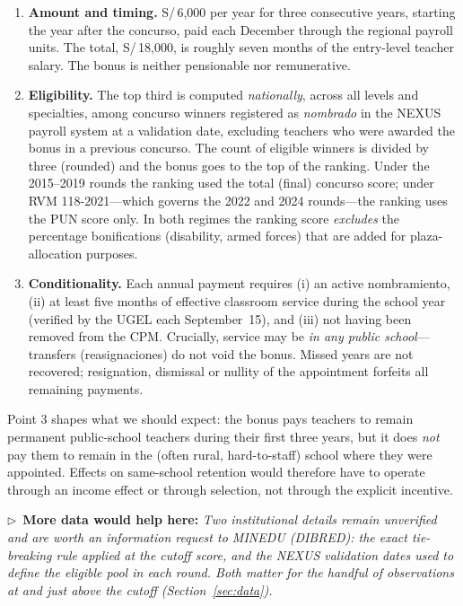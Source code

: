 \documentclass[11pt]{article}
\newcommand{\dataneed}[1]{\par\medskip\noindent\begin{small}\noindent
$\triangleright$~\textbf{More data would help here:} \emph{#1}\end{small}\par\medskip}
\begin{document}
\begin{enumerate}
\item \textbf{Amount and timing.} S/\,6,000 per year for three consecutive
years, starting the year after the concurso, paid each December through the
regional payroll units. The total, S/\,18,000, is roughly seven months of the
entry-level teacher salary. The bonus is neither pensionable nor
remunerative.
\item \textbf{Eligibility.} The top third is computed \emph{nationally},
across all levels and specialties, among concurso winners registered as
\emph{nombrado} in the NEXUS payroll system at a validation date, excluding
teachers who were awarded the bonus in a previous concurso. The count of
eligible winners is divided by three (rounded) and the bonus goes to the top
of the ranking. Under the 2015--2019 rounds the ranking used the total
(final) concurso score; under RVM 118-2021---which governs the 2022 and 2024
rounds---the ranking uses the PUN score only. In both regimes the ranking
score \emph{excludes} the percentage bonifications (disability, armed forces)
that are added for plaza-allocation purposes.
\item \textbf{Conditionality.} Each annual payment requires (i) an active
nombramiento, (ii) at least five months of effective classroom service during
the school year (verified by the UGEL each September~15), and (iii) not having
been removed from the CPM. Crucially, service may be \emph{in any public
school}---transfers (reasignaciones) do not void the bonus. Missed years are
not recovered; resignation, dismissal or nullity of the appointment forfeits
all remaining payments.
\end{enumerate}

Point 3 shapes what we should expect: the bonus pays teachers to remain
permanent public-school teachers during their first three years, but it does
\emph{not} pay them to remain in the (often rural, hard-to-staff) school where
they were appointed. Effects on same-school retention would therefore have to
operate through an income effect or through selection, not through the
explicit incentive.

\dataneed{Two institutional details remain unverified and are worth an
information request to MINEDU (DIBRED): the exact tie-breaking rule applied at
the cutoff score, and the NEXUS validation dates used to define the eligible
pool in each round. Both matter for the handful of observations at and just
above the cutoff (Section~\ref{sec:data}).}
\end{document}
